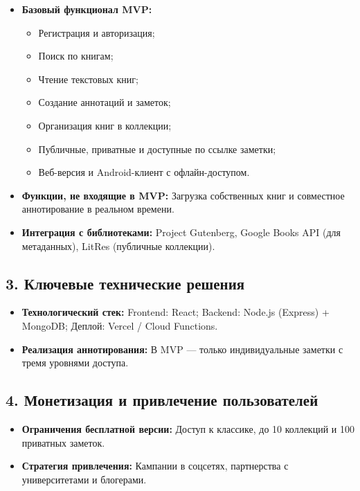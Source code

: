\documentclass[12pt,a4paper]{article}
\begin{document}
\begin{itemize}
    \item \textbf{Базовый функционал MVP:}
    \begin{itemize}
        \item Регистрация и авторизация;
        \item Поиск по книгам;
        \item Чтение текстовых книг;
        \item Создание аннотаций и заметок;
        \item Организация книг в коллекции;
        \item Публичные, приватные и доступные по ссылке заметки;
        \item Веб-версия и Android-клиент с офлайн-доступом.
    \end{itemize}
    \item \textbf{Функции, не входящие в MVP:} Загрузка собственных книг и совместное аннотирование в реальном времени.
    \item \textbf{Интеграция с библиотеками:} Project Gutenberg, Google Books API (для метаданных), LitRes (публичные коллекции).
\end{itemize}

\subsection*{3. Ключевые технические решения}

\begin{itemize}
    \item \textbf{Технологический стек:} Frontend: React; Backend: Node.js (Express) + MongoDB; Деплой: Vercel / Cloud Functions.
    \item \textbf{Реализация аннотирования:} В MVP — только индивидуальные заметки с тремя уровнями доступа.
\end{itemize}

\subsection*{4. Монетизация и привлечение пользователей}

\begin{itemize}
    \item \textbf{Ограничения бесплатной версии:} Доступ к классике, до 10 коллекций и 100 приватных заметок.
    \item \textbf{Стратегия привлечения:} Кампании в соцсетях, партнерства с университетами и блогерами.
\end{itemize}
\end{document}

